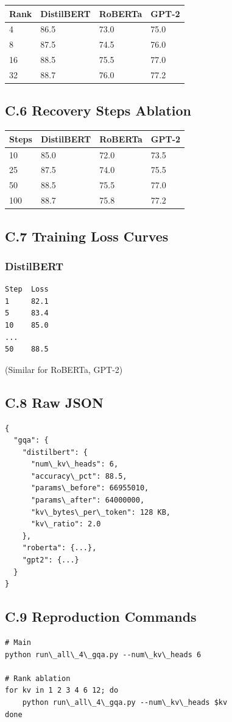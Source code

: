 \begin{table}[H]
\centering
\small
\begin{tabular}{llll}
\toprule
\textbf{Rank} & \textbf{DistilBERT} & \textbf{RoBERTa} & \textbf{GPT-2} \\
\midrule
4 & 86.5 & 73.0 & 75.0 \\
8 & 87.5 & 74.5 & 76.0 \\
16 & 88.5 & 75.5 & 77.0 \\
32 & 88.7 & 76.0 & 77.2 \\
\bottomrule
\end{tabular}
\end{table}

\subsection{C.6 Recovery Steps Ablation}

\begin{table}[H]
\centering
\small
\begin{tabular}{llll}
\toprule
\textbf{Steps} & \textbf{DistilBERT} & \textbf{RoBERTa} & \textbf{GPT-2} \\
\midrule
10 & 85.0 & 72.0 & 73.5 \\
25 & 87.5 & 74.0 & 75.5 \\
50 & 88.5 & 75.5 & 77.0 \\
100 & 88.7 & 75.8 & 77.2 \\
\bottomrule
\end{tabular}
\end{table}

\subsection{C.7 Training Loss Curves}

\subsubsection{DistilBERT}
\begin{lstlisting}
Step  Loss
1     82.1
5     83.4
10    85.0
...
50    88.5
\end{lstlisting}

(Similar for RoBERTa, GPT-2)

\subsection{C.8 Raw JSON}

\begin{lstlisting}
{
  "gqa": {
    "distilbert": {
      "num\_kv\_heads": 6,
      "accuracy\_pct": 88.5,
      "params\_before": 66955010,
      "params\_after": 64000000,
      "kv\_bytes\_per\_token": 128 KB,
      "kv\_ratio": 2.0
    },
    "roberta": {...},
    "gpt2": {...}
  }
}
\end{lstlisting}

\subsection{C.9 Reproduction Commands}

\begin{lstlisting}
# Main
python run\_all\_4\_gqa.py --num\_kv\_heads 6

# Rank ablation
for kv in 1 2 3 4 6 12; do
    python run\_all\_4\_gqa.py --num\_kv\_heads $kv
done
\end{lstlisting}